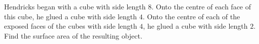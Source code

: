 Hendricks began with a cube with side length $8$. Onto the centre of each face of this cube, he glued a cube with side length $4$. Onto the centre of each of the exposed faces of the cubes with side length $4$, he glued a cube with side length $2$. Find the surface area of the resulting object.
